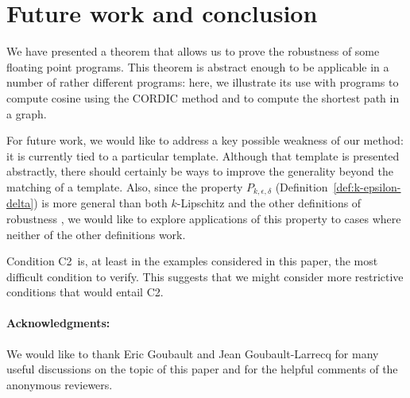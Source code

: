 \documentclass[copyright,creativecommons]{eptcs}
\newcommand{\Ctwo}{C2}
\begin{document}
\section{Future work and conclusion}\label{sec:conclude}


We have presented a theorem that allows us to prove the robustness of some
floating point programs.  This theorem is abstract enough to be
applicable in a number of rather different programs: here, we
illustrate its use with programs to compute cosine using the CORDIC
method and to compute the shortest path in a graph. 





For future work, we would like to address a key possible weakness of
our method: it is currently tied to a particular template.  Although
that template is presented abstractly, there should certainly be ways
to improve the generality beyond the matching of a template.  Also,
since the property $P_{k,\epsilon,\delta}$
(Definition~\ref{def:k-epsilon-delta}) is more general than both
$k$-Lipschitz and the other definitions of robustness
\cite{majumdar09rtss,majumdar10memocode}, we would like to explore
applications of this property to cases where neither of the other
definitions work.

Condition \Ctwo\ is, at least in the examples considered in this paper,
the most difficult condition to verify.  This suggests that we might
consider more restrictive conditions that would entail \Ctwo.

\paragraph{Acknowledgments:}  We would like to thank Eric Goubault and
Jean Goubault-Larrecq for many useful discussions on the topic of this
paper and for the helpful comments of the anonymous reviewers. 



\end{document}
